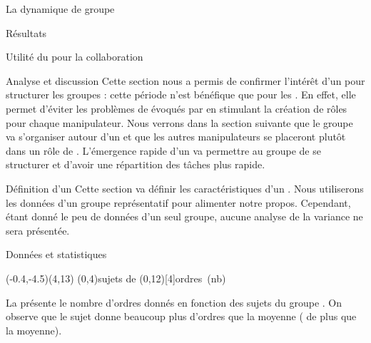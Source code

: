 \documentclass[myfrancais]{mythesis}
\begin{document}
\begin{mychapter}{La dynamique de groupe}
\begin{mysection}{Résultats}
\begin{mysubsection}{Utilité du \mybrainstorming pour la collaboration}
\begin{mysubsubsection}{Analyse et discussion}
					Cette section nous a permis de confirmer l'intérêt d'un \mybrainstorming pour structurer les groupes : cette période n'est bénéfique que pour les .
					En effet, elle permet d'éviter les problèmes de  évoqués par  en stimulant la création de rôles pour chaque manipulateur.
					Nous verrons dans la section suivante que le groupe va s'organiser autour d'un  et que les autres manipulateurs se placeront plutôt dans un rôle de .
					L'émergence rapide d'un  va permettre au groupe de se structurer et d'avoir une répartition des tâches plus rapide.
				\end{mysubsubsection}
			\end{mysubsection}
			\begin{mysubsection}{Définition d'un }
				Cette section va définir les caractéristiques d'un .
				Nous utiliserons les données d'un groupe représentatif pour alimenter notre propos.
				Cependant, étant donné le peu de données d'un seul groupe, aucune analyse de la variance ne sera présentée.
				\begin{mysubsubsection}{Données et statistiques}
					\begin{myfigure}
						\begin{myps}(-0.4,-4.5)(4,13)
							\myaxes(0,4){sujets de }(0,12)[4]{ordres~(nb)}
						\end{myps}
					\end{myfigure}

					La  présente le nombre d'ordres donnés  en fonction des sujets du groupe .
					On observe que le sujet  donne beaucoup plus d'ordres que la moyenne ( de plus que la moyenne).


\end{mysubsubsection}
\end{mysubsection}
\end{mysection}
\end{mychapter}
\end{document}
